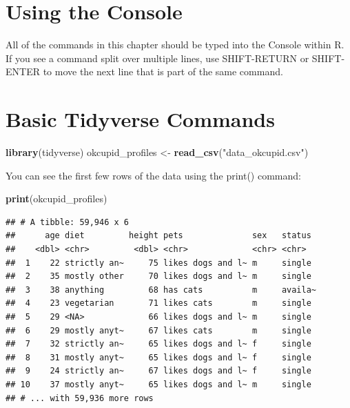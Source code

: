 \documentclass[
]{krantz}
\makeatletter
\newenvironment{Shaded}{\begin{snugshade}}{\end{snugshade}}
\newcommand{\KeywordTok}[1]{\textcolor[rgb]{0.27,0.27,0.27}{\textbf{#1}}}
\newcommand{\NormalTok}[1]{#1}
\newcommand{\StringTok}[1]{\textcolor[rgb]{0.5,0.5,0.5}{#1}}
\newenvironment{kframe}{%
\medskip{}
\setlength{\fboxsep}{.8em}
 \def\at@end@of@kframe{}%
 \ifinner\ifhmode%
  \def\at@end@of@kframe{\end{minipage}}%
  \begin{minipage}{\columnwidth}%
 \fi\fi%
 \def\FrameCommand##1{\hskip\@totalleftmargin \hskip-\fboxsep
 \colorbox{shadecolor}{##1}\hskip-\fboxsep
     \hskip-\linewidth \hskip-\@totalleftmargin \hskip\columnwidth}%
 \MakeFramed {\advance\hsize-\width
   \@totalleftmargin\z@ \linewidth\hsize
   \@setminipage}}%
 {\par\unskip\endMakeFramed%
 \at@end@of@kframe}
\renewenvironment{Shaded}{\begin{kframe}}{\end{kframe}}
\makeatother
\begin{document}
\hypertarget{using-the-console}{%
\section{Using the Console}\label{using-the-console}}

All of the commands in this chapter should be typed into the Console within R. If you see a command split over multiple lines, use SHIFT-RETURN or SHIFT-ENTER to move the next line that is part of the same command.

\hypertarget{basic-tidyverse-commands}{%
\section{Basic Tidyverse Commands}\label{basic-tidyverse-commands}}

\begin{Shaded}
\begin{Highlighting}[]
\KeywordTok{library}\NormalTok{(tidyverse)}
\NormalTok{okcupid_profiles <-}\StringTok{ }\KeywordTok{read_csv}\NormalTok{(}\StringTok{"data_okcupid.csv"}\NormalTok{)}
\end{Highlighting}
\end{Shaded}

You can see the first few rows of the data using the print() command:

\begin{Shaded}
\begin{Highlighting}[]
\KeywordTok{print}\NormalTok{(okcupid_profiles)}
\end{Highlighting}
\end{Shaded}

\begin{verbatim}
## # A tibble: 59,946 x 6
##      age diet         height pets              sex   status 
##    <dbl> <chr>         <dbl> <chr>             <chr> <chr>  
##  1    22 strictly an~     75 likes dogs and l~ m     single 
##  2    35 mostly other     70 likes dogs and l~ m     single 
##  3    38 anything         68 has cats          m     availa~
##  4    23 vegetarian       71 likes cats        m     single 
##  5    29 <NA>             66 likes dogs and l~ m     single 
##  6    29 mostly anyt~     67 likes cats        m     single 
##  7    32 strictly an~     65 likes dogs and l~ f     single 
##  8    31 mostly anyt~     65 likes dogs and l~ f     single 
##  9    24 strictly an~     67 likes dogs and l~ f     single 
## 10    37 mostly anyt~     65 likes dogs and l~ m     single 
## # ... with 59,936 more rows
\end{verbatim}
\end{document}
